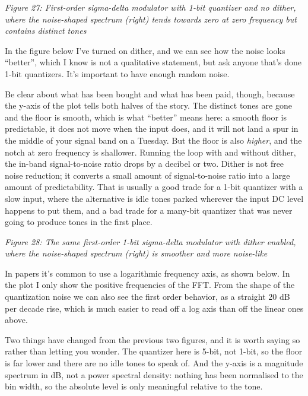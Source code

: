 {
\centering
{}
}

\emph{Figure 27: First-order sigma-delta modulator with 1-bit quantizer
and no dither, where the noise-shaped spectrum (right) tends towards
zero at zero frequency but contains distinct tones}

In the figure below I've turned on dither, and we can see how the noise
looks ``better'', which I know is not a qualitative statement, but ask
anyone that's done 1-bit quantizers. It's important to have enough
random noise.

Be clear about what has been bought and what has been paid, though,
because the y-axis of the plot tells both halves of the story. The
distinct tones are gone and the floor is smooth, which is what
``better'' means here: a smooth floor is predictable, it does not move
when the input does, and it will not land a spur in the middle of your
signal band on a Tuesday. But the floor is also \emph{higher}, and the
notch at zero frequency is shallower. Running the loop with and without
dither, the in-band signal-to-noise ratio drops by a decibel or two.
Dither is not free noise reduction; it converts a small amount of
signal-to-noise ratio into a large amount of predictability. That is
usually a good trade for a 1-bit quantizer with a slow input, where the
alternative is idle tones parked wherever the input DC level happens to
put them, and a bad trade for a many-bit quantizer that was never going
to produce tones in the first place.


{
\centering
{}
}

\emph{Figure 28: The same first-order 1-bit sigma-delta modulator with
dither enabled, where the noise-shaped spectrum (right) is smoother and
more noise-like}

In papers it's common to use a logarithmic frequency axis, as shown
below. In the plot I only show the positive frequencies of the FFT. From
the shape of the quantization noise we can also see the first order
behavior, as a straight 20 dB per decade rise, which is much easier to
read off a log axis than off the linear ones above.

Two things have changed from the previous two figures, and it is worth
saying so rather than letting you wonder. The quantizer here is 5-bit,
not 1-bit, so the floor is far lower and there are no idle tones to
speak of. And the y-axis is a magnitude spectrum in dB, not a power
spectral density: nothing has been normalised to the bin width, so the
absolute level is only meaningful relative to the tone.


